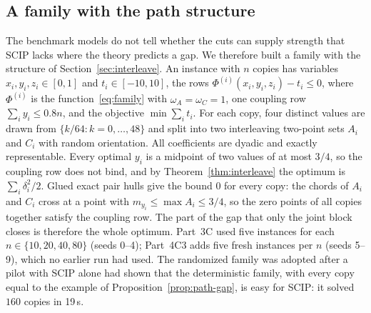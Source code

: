 \subsection{A family with the path structure}\label{sec:mechanism}

The benchmark models do not tell whether the cuts can supply strength that
SCIP lacks where the theory predicts a gap. We therefore built a family with
the structure of Section~\ref{sec:interleave}. An instance with $n$ copies has
variables $x_i,y_i,z_i\in[0,1]$ and $t_i\in[-10,10]$, the rows
$\Phi^{(i)}(x_i,y_i,z_i)-t_i\le0$, where $\Phi^{(i)}$ is the
function~\eqref{eq:family} with $\omega_A=\omega_C=1$, one coupling row
$\sum_iy_i\le0.8n$, and the objective $\min\sum_it_i$. For each copy, four
distinct values are drawn from $\{k/64:k=0,\dots,48\}$ and split into two
interleaving two-point sets $A_i$ and $C_i$ with random orientation. All
coefficients are dyadic and exactly representable. Every optimal $y_i$ is a
midpoint of two values of at most $3/4$, so the coupling row does not bind, and
by Theorem~\ref{thm:interleave} the optimum is $\sum_i\delta_i^2/2$. Glued exact
pair hulls give the bound $0$ for every copy: the chords of $A_i$ and $C_i$
cross at a point with $m_{y_i}\le\max A_i\le3/4$, so the zero points of all
copies together satisfy the coupling row. The part of the gap that only the
joint block closes is therefore the whole optimum. Part~3C used five instances
for each $n\in\{10,20,40,80\}$ (seeds 0--4); Part~4C3 adds five fresh instances
per $n$ (seeds 5--9), which no earlier run had used. The randomized family was
adopted after a pilot with SCIP alone had shown that the deterministic family,
with every copy equal to the example of Proposition~\ref{prop:path-gap}, is
easy for SCIP: it solved $160$ copies in 19\,s.

